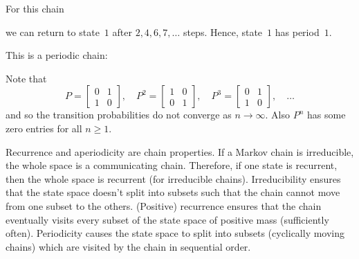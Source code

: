 \begin{example}
\label{ex:A.19}
For this chain
\begin{center}
\end{center}
we can return to state~$1$ after $2, 4, 6, 7, \ldots$ steps.  Hence, state~$1$ has period~$1$.
\end{example}

\begin{example}
\label{ex:A.20}
This is a periodic chain:
\begin{center}
\end{center}
Note that
\[
  P = \begin{bmatrix} 0 & 1 \\ 1 & 0 \end{bmatrix}, \quad
  P^2 = \begin{bmatrix} 1 & 0 \\ 0 & 1 \end{bmatrix}, \quad
  P^3 = \begin{bmatrix} 0 & 1 \\ 1 & 0 \end{bmatrix}, \quad \ldots
\]
and so the transition probabilities do not converge as $n \to \infty$.  Also $P^n$ has some zero
entries for all $n \geq 1$.
\end{example}

\begin{remark}
\label{rem:A.21}
Recurrence and aperiodicity are chain properties.  If a Markov chain is irreducible, the whole
space is a communicating chain.  Therefore, if one state is recurrent, then the whole space is
recurrent (for irreducible chains).  Irreducibility ensures that the state space doesn't split into
subsets such that the chain cannot move from one subset to the others.  (Positive) recurrence
ensures that the chain eventually visits every subset of the state space of positive mass
(sufficiently often).  Periodicity causes the state space to split into subsets (cyclically moving
chains) which are visited by the chain in sequential order.
\end{remark}
